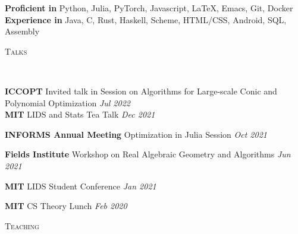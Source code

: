 \documentclass[9pt]{article}
\newenvironment{changemargin}[2]{%
  \begin{list}{}{%
      \setlength{\topsep}{0pt}%
      \setlength{\leftmargin}{#1}%
      \setlength{\rightmargin}{#2}%
      \setlength{\listparindent}{\parindent}%
      \setlength{\itemindent}{\parindent}%
      \setlength{\parsep}{\parskip}%
    }%
  \item[]}{\end{list}
}
\newcommand{\lineover}{
  \begin{changemargin}{-0.05in}{-0.05in}
    \vspace*{-8pt}
    \hrulefill \\
    \vspace*{-2pt}
  \end{changemargin}
}
\newcommand{\header}[1]{
  \begin{changemargin}{-0.5in}{-0.5in}
    \scshape{#1}\\
    \lineover
  \end{changemargin}
}
\newenvironment{body} {
  \vspace*{-16pt}
  \begin{changemargin}{-0.25in}{-0.5in}
  }
  {\end{changemargin}
}
\begin{document}
\begin{body}
  \vspace{14pt}
  \textbf{Proficient in} Python, Julia, PyTorch, Javascript, \LaTeX, Emacs, Git, Docker \\
  \smallskip
  \textbf{Experience in} Java, C, Rust, Haskell, Scheme, HTML/CSS, Android, SQL,
  Assembly
\end{body}

\smallskip


\header{Talks}
\begin{body}
  \vspace{14pt}
  \textbf{ICCOPT} Invited talk in Session on Algorithms for Large-scale Conic and Polynomial Optimization \hfill{} \emph{Jul 2022}\\

  \textbf{MIT} LIDS and Stats Tea Talk \hfill{} \emph{Dec 2021}\\
  \smallskip

  \textbf{INFORMS Annual Meeting} Optimization in Julia Session \hfill{} \emph{Oct 2021} \\
  \smallskip

  \textbf{Fields Institute} Workshop on Real Algebraic Geometry and Algorithms
   \hfill{} \emph{Jun 2021}\\
  \smallskip

  \textbf{MIT} LIDS Student Conference \hfill{} \emph{Jan 2021}\\
  \smallskip

  \textbf{MIT} CS Theory Lunch \hfill{} \emph{Feb 2020}\\
  \smallskip
\end{body}

\smallskip



\header{Teaching }
\end{document}
